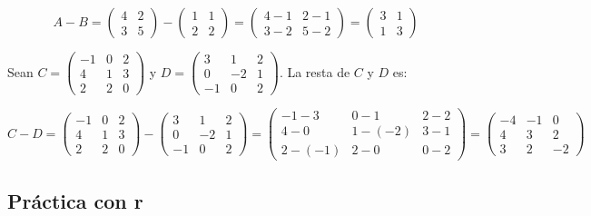 \begin{}
\begin{example}
\[ A - B = \begin{pmatrix} 4 & 2 \\ 3 & 5 \end{pmatrix} - \begin{pmatrix} 1 & 1 \\ 2 & 2 \end{pmatrix} = \begin{pmatrix} 4 - 1 & 2 - 1 \\ 3 - 2 & 5 - 2 \end{pmatrix} = \begin{pmatrix} 3 & 1 \\ 1 & 3 \end{pmatrix} \]
\end{example}
\begin{example}
Sean \( C = \begin{pmatrix} -1 & 0 & 2 \\ 4 & 1 & 3 \\ 2 & 2 & 0 \end{pmatrix} \) y \( D = \begin{pmatrix} 3 & 1 & 2 \\ 0 & -2 & 1 \\ -1 & 0 & 2 \end{pmatrix} \). La resta de \( C \) y \( D \) es:

\[ C - D = \begin{pmatrix} -1 & 0 & 2 \\ 4 & 1 & 3 \\ 2 & 2 & 0 \end{pmatrix} - \begin{pmatrix} 3 & 1 & 2 \\ 0 & -2 & 1 \\ -1 & 0 & 2 \end{pmatrix} = \begin{pmatrix} -1 - 3 & 0 - 1 & 2 - 2 \\ 4 - 0 & 1 - (-2) & 3 - 1 \\ 2 - (-1) & 2 - 0 & 0 - 2 \end{pmatrix} = \begin{pmatrix} -4 & -1 & 0 \\ 4 & 3 & 2 \\ 3 & 2 & -2 \end{pmatrix} \]
    
\end{example}
\subsection{Práctica con r}


\end{}
